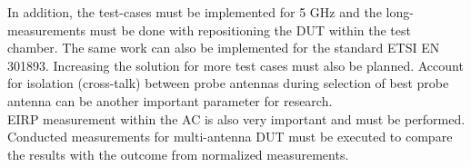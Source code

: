  In addition, the test-cases must be implemented for 5 GHz and the long-measurements must be done with repositioning the \acs{DUT} within the test chamber. The same work can also be implemented for the standard ETSI EN 301893. Increasing the solution for more test cases must also be planned.  Account for isolation (cross-talk) between probe antennas during selection of best probe antenna can be another important parameter for research. \\
 
 \acs{EIRP} measurement within the \acf{AC} is also very important and must be performed. Conducted measurements for multi-antenna \acs{DUT} must be executed to compare the results with the outcome from normalized measurements. 


